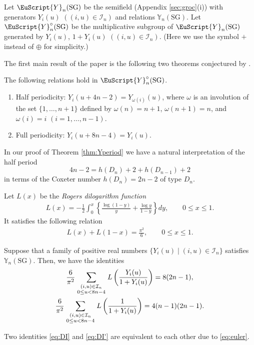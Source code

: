 \begin{Definition}
\label{def:YC}
Let $\EuScript{Y}_{n}(\mathrm{SG})$
be the semif\/ield (Appendix \ref{sec:groc}(i)) with generators
$Y_i(u)$
 $((i,u)\in \mathcal{I}_{n})$
and relations $\mathbb{Y}_{n}(\mathrm{SG})$.
Let $\EuScript{Y}^{\circ}_{n}(\mathrm{SG})$
be the multiplicative subgroup
of $\EuScript{Y}_{n}(\mathrm{SG})$
generated by
$Y_i(u)$, $1+Y_i(u)$
 $((i,u)\in \mathcal{I}_{n})$.
(Here we use the symbol $+$ instead of $\oplus$
for simplicity.)
\end{Definition}
The f\/irst main result of the paper is
the following two theorems conjectured by
\cite{Tateo95}.

\begin{Theorem}[Periodicity]
\label{thm:Yperiod}
The following relations hold in $\EuScript{Y}^{\circ}_{n}(\mathrm{SG})$.
\begin{enumerate}\itemsep=0pt
\item[$(i)$] Half periodicity: $Y_i(u+4n-2)=Y_{\omega(i)}(u)$, where
$\omega$ is an involution of the set $\{1,\dots,n+1\}$
defined by $\omega(n)=n+1$, $\omega(n+1)=n$,
and $\omega(i)=i$ $(i=1,\dots,n-1)$.
\item[$(ii)$] Full periodicity: $Y_i(u+8n-4)=Y_i(u)$.
\end{enumerate}
\end{Theorem}

In our proof of Theorem \ref{thm:Yperiod}
we have  a natural interpretation
of the  half period
\[
4n-2=h(D_n)+2+h(D_{n-1})+2
\]
in terms of the Coxeter number  $h(D_n)=2n-2$ of type $D_n$.

Let $L(x)$ be the {\em Rogers dilogarithm function\/}
 \cite{Lewin81}
\begin{gather*}
L(x)=-\frac{1}{2}\int_{0}^x
\left\{ \frac{\log(1-y)}{y}+
\frac{\log y}{1-y}
\right\} dy,
\qquad 0\leq x\leq 1.
\end{gather*}
It satisf\/ies the following relation
\begin{gather}
\label{eq:euler}
L(x)+L(1-x)=\frac{\pi^2}{6},
\qquad 0\leq x\leq 1.
\end{gather}

\begin{Theorem}
\label{thm:dilog}
Suppose that a family of positive real numbers
$\{ Y_i(u) \mid (i,u)\in \mathcal{I}_n\}$ satisfies
$\mathbb{Y}_n(\mathrm{SG})$.
Then, we have the identities
\begin{gather}
\label{eq:DI}
\frac{6}{\pi^2}
\sum_{
\genfrac{}{}{0pt}{1}
{
(i,u)\in \mathcal{I}_{n}
}
{
0\leq u < 8n-4
}
}
L\left(
\frac{Y_i(u)}{1+Y_i(u)}
\right)
 =8(2n-1),\\
\label{eq:DI'}
\frac{6}{\pi^2}
\sum_{
\genfrac{}{}{0pt}{1}
{
(i,u)\in \mathcal{I}_{n}
}
{
0\leq u < 8n-4
}
}
L\left(
\frac{1}{1+Y_i(u)}
\right)
 =4(n-1)(2n-1).
\end{gather}
\end{Theorem}
Two identities
\eqref{eq:DI} and \eqref{eq:DI'}
are equivalent to each other due to \eqref{eq:euler}.


